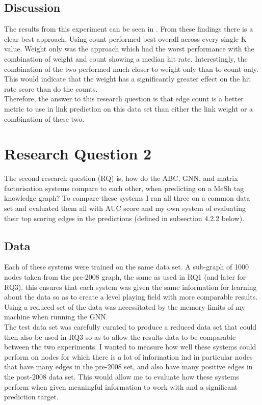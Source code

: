 \documentclass{l4proj}
\begin{document}
\subsection{Discussion}

The results from this experiment can be seen in . From these findings there is a clear best approach. Using count performed best overall across every single K value. Weight only was the approach which had the worst performance with the combination of weight and count showing a median hit rate. Interestingly, the combination of the two performed much closer to weight only than to count only. This would indicate that the weight has a significantly greater effect on the hit rate score than do the counts. \\ 

Therefore, the answer to this research question is that edge count is a better metric to use in link prediction on this data set than either the link weight or a combination of these two. \\

\section{Research Question 2}

The second research question (RQ) is, how do the ABC, GNN, and matrix factorisation systems compare to each other, when predicting on a MeSh tag knowledge graph? To compare these systems I ran all three on a common data set and evaluated them all with AUC score and my own system of evaluating their top scoring edges in the predictions (defined in subsection 4.2.2 below). \\

\subsection{Data}

Each of these systems were trained on the same data set. A sub-graph of 1000 nodes taken from the pre-2008 graph, the same as used in RQ1 (and later for RQ3). this ensures that each system was given the same information for learning about the data so as to create a level playing field with more comparable results. Using a reduced set of the data was necessitated by the memory limits of my machine when running the GNN. \\

The test data set was carefully curated to produce a reduced data set that could then also be used in RQ3 so as to allow the results data to be comparable between the two experiments. I wanted to measure how well these systems could perform on nodes for which there is a lot of information ind in particular nodes that have many edges in the pre-2008 set, and also have many positive edges in the post-2008 data set. This would allow me to evaluate how these systems perform when given meaningful information to work with and a significant prediction target. \\
\end{document}
